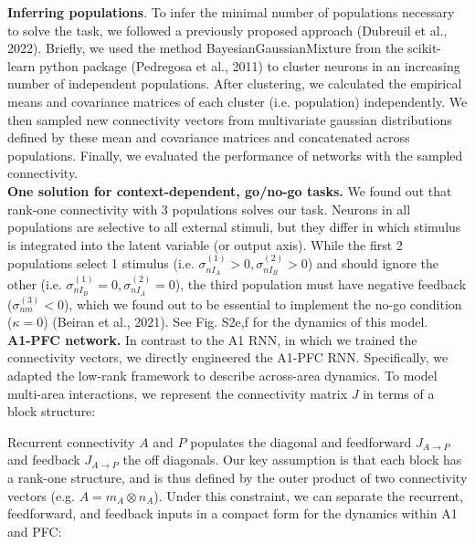 \documentclass[12pt]{article}
\begin{document}
\textbf{Inferring populations}. To infer the minimal number of populations necessary to solve the task, we followed a previously proposed approach (Dubreuil et al., 2022). Briefly, we used the method BayesianGaussianMixture from the scikit-learn python package (Pedregosa et al., 2011) to cluster neurons in an increasing number of independent populations. After clustering, we calculated the empirical means and covariance matrices of each cluster (i.e. population) independently. We then sampled new connectivity vectors from multivariate gaussian distributions defined by these mean and covariance matrices and concatenated across populations. Finally, we evaluated the performance of networks with the sampled connectivity. \\

\textbf{One solution for context-dependent, go/no-go tasks.} We found out that rank-one connectivity with 3 populations solves our task. Neurons in all populations are selective to all external stimuli, but they differ in which stimulus is integrated into the latent variable (or output axis). While the first 2 populations select 1 stimulus (i.e. $ \sigma_{nI_A}^{(1)}>0, \sigma_{nI_B}^{(2)}>0$) and should ignore the other (i.e. $\sigma_{nI_B}^{(1)}=0, \sigma_{nI_A}^{(2)}=0$), the third population must have negative feedback ($\sigma_{nm}^{(3)}<0$), which we found out to be essential to implement the no-go condition ($\kappa = 0$) (Beiran et al., 2021). See Fig. S2e,f for the dynamics of this model. \\

\textbf{A1-PFC network.}  In contrast to the A1 RNN, in which we trained the connectivity vectors, we directly engineered the A1-PFC RNN. Specifically, we adapted the low-rank framework to describe across-area dynamics. To model multi-area interactions, we represent the connectivity matrix $J$ in terms of a block structure:


Recurrent connectivity $A$ and $P$ populates the diagonal and feedforward $J_{A \to P} $ and feedback $J_{A \to P} $ the off diagonals. Our key assumption is that each block has a rank-one structure, and is thus defined by the outer product of two connectivity vectors (e.g. $A = m_A \otimes n_A $). Under this constraint, we can separate the recurrent, feedforward, and feedback inputs in a compact form for the dynamics within A1 and PFC: 
\end{document}
